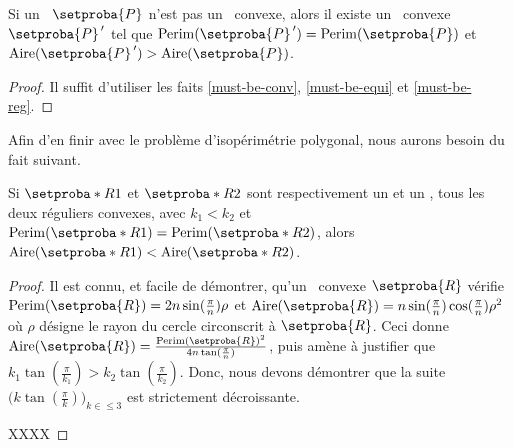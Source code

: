 

\begin{fact} \label{nece-cond}
	Si un \ngone\ $\setproba{P}$ n'est pas un \nreg\ convexe,
	alors il existe un \ngone\ convexe $\primeit{\setproba{P}}$ tel que
	$\perim{\primeit{\setproba{P}}} = \perim{\setproba{P}}$
	et
	$\area{\primeit{\setproba{P}}} > \area{\setproba{P}}$.
\end{fact}


\begin{proof}
	Il suffit d'utiliser les faits \ref{must-be-conv}, \ref{must-be-equi} et \ref{must-be-reg}.
\end{proof}




Afin d'en finir avec le problème d'isopérimétrie polygonal, nous aurons besoin du fait suivant.


\begin{fact} \label{nregs-sorting}
	Si $\setproba*{R}{1}$ et $\setproba*{R}{2}$ sont respectivement un  et un , tous les deux réguliers convexes, avec 
	$k_1 < k_2$ et $\perim{\setproba*{R}{1}} = \perim{\setproba*{R}{2}}$,
	alors
	$\area{\setproba*{R}{1}} < \area{\setproba*{R}{2}}$.
\end{fact}


\begin{proof}
    Il est connu, et facile de démontrer, qu'un \nreg\ convexe $\setproba{R}$ vérifie
    $\perim{\setproba{R}} = 2 n \sin (\frac{\pi}{n}) \rho$
    et
	$\area{\setproba{R}} = n \sin (\frac{\pi}{n})  \cos (\frac{\pi}{n}) \rho^2$
	où $\rho$ désigne le rayon du cercle circonscrit à $\setproba{R}$.
	Ceci donne 
	$\area{\setproba{R}} = \frac{\perim{\setproba{R}}^2}{4 n \tan (\frac{\pi}{n})}$,
	puis amène à justifier que 
	$k_1 \tan (\frac{\pi}{k_1}) > k_2 \tan (\frac{\pi}{k_2})$.
	Donc, nous devons démontrer que la suite $\big( k \tan (\frac{\pi}{k}) \big)_{k \in \leq 3}$ est strictement décroissante.
	
	
	XXXX
\end{proof}

